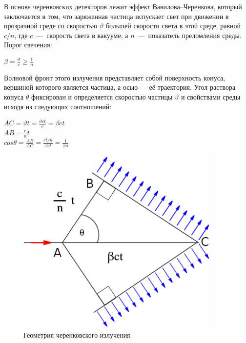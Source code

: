 
\begin{minipage}[t]{0.495\textwidth}
В основе черенковских детекторов лежит эффект Вавилова--Черенкова, который заключается в том, что заряженная частица испускает свет при движении в прозрачной среде со скоростью $\vartheta$ большей скорости света в этой среде, равной $c/n$, где $c$~---~скорость света в вакууме, а $n$~---~показатель преломления среды. Порог свечения: \\
\begin{spacing}{1.5}
{\centering
$\beta = \frac{\vartheta}{c} \geq \frac{1}{n}$ \\}
\end{spacing}
Волновой фронт этого излучения представляет собой поверхность конуса, вершиной которого является частица, а осью --- её траектория. Угол раствора конуса $\theta$ фиксирован и определяется скоростью частицы $\vartheta$ и свойствами среды исходя из следующих соотношений: \\
\begin{spacing}{1.5}
{\centering
$AC = \vartheta t = \frac{\vartheta c t}{c} = \beta c t$ \\
$AB = \frac{c}{n} t$ \\
$cos\theta = \frac{AB}{AC} = \frac{ct/n}{\beta c t} = \frac{1}{\beta n}$ \\}
\end{spacing}
\end{minipage}
\begin{minipage}[t]{0.495\textwidth}
\begin{figure}[H]
\includegraphics[width=0.9\textwidth]{pictures/Cherenkov.png}
\caption{Геометрия черенковского излучения.}
\label{fig:CherenkovGeo}
\end{figure}
\end{minipage}

